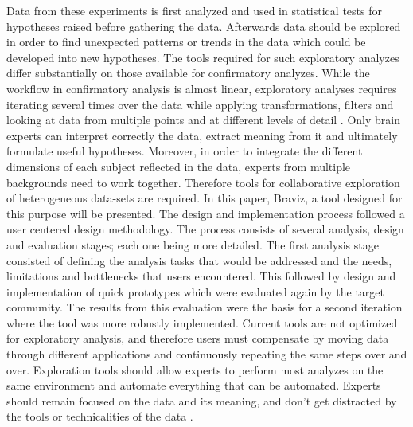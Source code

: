 \documentclass[utf8,paper]{frontiersSCNS} %
\begin{document}
Data from these experiments is first analyzed and used in statistical tests for hypotheses raised before gathering the data. Afterwards data should be explored \citep{tukey_we_1980} in order to find unexpected patterns or trends in the data which could be developed into new hypotheses. The tools required for such exploratory analyzes differ substantially on those available for confirmatory analyzes. While the workflow in confirmatory analysis is almost linear, exploratory analyses requires iterating several times over the data while applying transformations, filters and looking at data from multiple points and at different levels of detail \citep{schneiderman_designing_1998}.
Only brain experts can interpret correctly the data, extract meaning from it and ultimately formulate useful hypotheses. Moreover, in order to integrate the different dimensions of each subject reflected in the data, experts from multiple backgrounds need to work together. Therefore tools for collaborative exploration of heterogeneous data-sets are required. In this paper, Braviz, a tool designed for this purpose will be presented.
The design and implementation process followed a user centered design \citep{wassink_applying_2009} methodology. The process consists of several analysis, design and evaluation stages; each one being more detailed. The first analysis stage consisted of defining the analysis tasks that would be addressed and the needs, limitations and bottlenecks that users encountered. This followed by design and implementation of quick prototypes which were evaluated again by the target community. The results from this evaluation were the basis for a second iteration where the tool was more robustly implemented. 
Current tools are not optimized for exploratory analysis, and therefore users must compensate by moving data through different applications and continuously repeating the same steps over and over. Exploration tools should allow experts to perform most analyzes on the same environment and automate everything that can be automated. Experts should remain focused on the data and its meaning, and don't get distracted by the tools or technicalities of the data \citep{keim_mastering_2010}.
\end{document}
